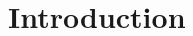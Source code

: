 \documentclass{ipol}
\begin{document}
\begin{abstract}
\end{abstract}

\begin{ipolCode}
\end{ipolCode}

\begin{ipolSupp}
\end{ipolSupp}

\section{Introduction}
\begin{thebibliography}{9}

\end{thebibliography}
\end{document}
